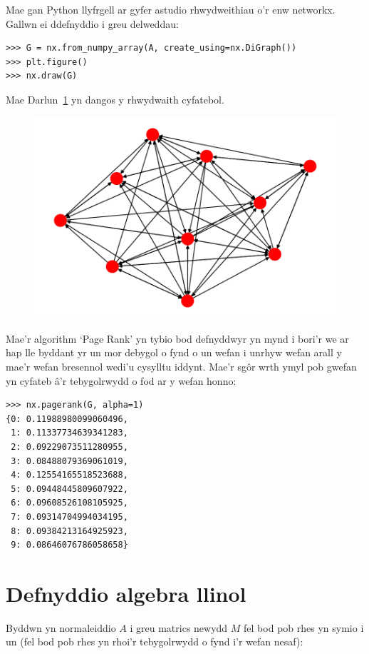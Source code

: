 \documentclass[a4paper]{article}
\begin{document}
Mae gan Python llyfrgell ar gyfer astudio rhwydweithiau o'r enw networkx. Gallwn
ei ddefnyddio i greu delweddau:

\begin{verbatim}
>>> G = nx.from_numpy_array(A, create_using=nx.DiGraph())
>>> plt.figure()
>>> nx.draw(G)
\end{verbatim}

Mae Darlun~\ref{fig:image_of_graph} yn dangos y rhwydwaith cyfatebol.

\begin{figure}[!hbtp]
    \includegraphics[width=.8\textwidth]{graph.pdf}
    \label{fig:image_of_graph}
\end{figure}

Mae'r algorithm `Page Rank' yn tybio bod defnyddwyr yn mynd i bori'r we ar hap
lle byddant yr un mor debygol o fynd o un wefan i unrhyw wefan arall y mae'r
wefan bresennol wedi'u cysylltu iddynt. Mae'r sg\^{o}r wrth ymyl pob gwefan yn
cyfateb \^{a}'r tebygolrwydd o fod ar y wefan honno:

\begin{verbatim}
>>> nx.pagerank(G, alpha=1)
{0: 0.11988980099060496,
 1: 0.11337734639341283,
 2: 0.09229073511280955,
 3: 0.08488079369061019,
 4: 0.12554165518523688,
 5: 0.09448445809607922,
 6: 0.09608526108105925,
 7: 0.09314704994034195,
 8: 0.09384213164925923,
 9: 0.08646076786058658}
\end{verbatim}

\section{Defnyddio algebra llinol}

Byddwn yn normaleiddio \(A\) i greu matrics newydd \(M\) fel bod pob rhes yn
symio i un (fel bod pob rhes yn rhoi'r tebygolrwydd o fynd i'r wefan nesaf):
\end{document}
